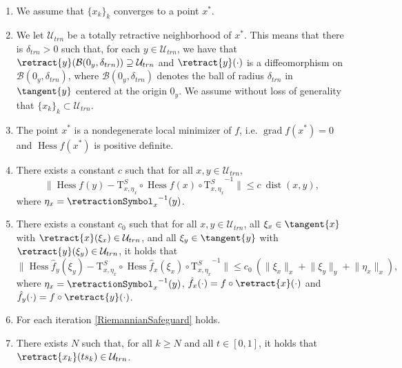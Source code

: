 \begin{assumption}\label{RiemannianAssumptionsLocalConvergence} \ \\[-1.5\baselineskip]
    \begin{enumerate}
        \item We assume that $\{ x_k \}_k$ converges to a point $x^*$.
        \item We let $\mathcal{U}_{trn}$ be a totally retractive neighborhood of $x^*$. This means that there is $\delta_{trn} > 0$ such that, for each $y \in \mathcal{U}_{trn}$, we have that $\retract{y}(\mathcal{B}(0_y, \delta_{trn})) \supseteq \mathcal{U}_{trn}$ and $\retract{y}(\cdot)$ is a diffeomorphism on $\mathcal{B}(0_y, \delta_{trn})$, where $\mathcal{B}(0_y, \delta_{trn})$ denotes the ball of radius $\delta_{trn}$ in $\tangent{y}$ centered at the origin $0_y$. We assume without loss of generality that $\{ x_k \}_k \subset \mathcal{U}_{trn}$.
        \item The point $x^*$ is a nondegenerate local minimizer of $f$, i.e. $\operatorname{grad} f(x^*) = 0$ and $\operatorname{Hess} f(x^*)$ is positive definite.
        \item There exists a constant $c$ such that for all $x, y \in \mathcal{U}_{trn}$, \begin{equation*} \lVert \operatorname{Hess} f(y) - \mathrm{T}^{S}_{x, \eta_x} \circ \operatorname{Hess} f(x) \circ {\mathrm{T}^{S}_{x, \eta_x}}^{-1} \rVert \leq c \ \operatorname{dist}(x,y), \end{equation*} where $\eta_x = {\retractionSymbol_{x}}^{-1}(y)$.
        \item There exists a constant $c_0$ such that for all $x, y \in \mathcal{U}_{trn}$, all $\xi_x \in \tangent{x}$ with $\retract{x}(\xi_x) \in \mathcal{U}_{trn}$, and all $\xi_y \in \tangent{y}$ with $\retract{y}(\xi_y) \in \mathcal{U}_{trn}$, it holds that \begin{equation*} \lVert \operatorname{Hess} \hat{f}_y(\xi_y) - \mathrm{T}^{S}_{x, \eta_x} \circ \operatorname{Hess} \hat{f}_x(\xi_x) \circ {\mathrm{T}^{S}_{x, \eta_x}}^{-1} \rVert \leq c_0 \ (\lVert \xi_x \rVert_x + \lVert \xi_y \rVert_y + \lVert \eta_x \rVert_x), \end{equation*} where $\eta_x = {\retractionSymbol_{x}}^{-1}(y)$, $\hat{f}_x(\cdot) = f \circ \retract{x}(\cdot)$ and $\hat{f}_y(\cdot) = f \circ \retract{y}(\cdot)$.
        \item For each iteration \cref{RiemannianSafeguard} holds.
        \item There exists $N$ such that, for all $k \geq N$ and all $t \in [0, 1]$, it holds that $\retract{x_k}(t s_k) \in \mathcal{U}_{trn}$.
    \end{enumerate}
\end{assumption}
